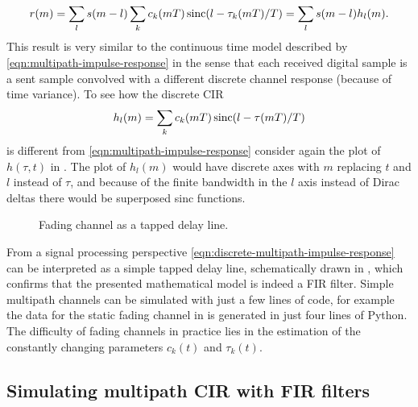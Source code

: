 \begin{equation}
	r(m) = \sum_l s(m - l) \sum_k c_k(mT) \operatorname{sinc}(l - \tau_k(mT)/T) 
	= \sum_l s(m - l) h_l (m).
\end{equation}
This result is very similar to the continuous time model described by \eqref{eqn:multipath-impulse-response} in the sense that each received digital sample is a sent sample convolved with a different discrete channel response (because of time variance). To see how the discrete CIR
\begin{equation} \label{eqn:discrete-multipath-impulse-response}
	h_l(m) = \sum_k c_k(mT) \operatorname{sinc}(l - \tau(mT)/T)
\end{equation}
is different from \eqref{eqn:multipath-impulse-response} consider again the plot of \(h(\tau,t)\) in . The plot of \(h_l(m)\) would have discrete axes with \(m\) replacing \(t\) and \(l\) instead of \(\tau\), and because of the finite bandwidth in the \(l\) axis instead of Dirac deltas there would be superposed sinc functions.

\begin{figure}
	\centering
	
	\caption{
		Fading channel as a tapped delay line.
		\label{fig:tapped-delay-line}
	}
\end{figure}

From a signal processing perspective \eqref{eqn:discrete-multipath-impulse-response} can be interpreted as a simple tapped delay line, schematically drawn in , which confirms that the presented mathematical model is indeed a FIR filter. Simple multipath channels can be simulated with just a few lines of code, for example the data for the static fading channel in  is generated in just four lines of Python. The difficulty of fading channels in practice lies in the estimation of the constantly changing parameters \(c_k(t)\) and \(\tau_k(t)\).


\subsection{Simulating multipath CIR with FIR filters} \label{sec:fractional-delay}

